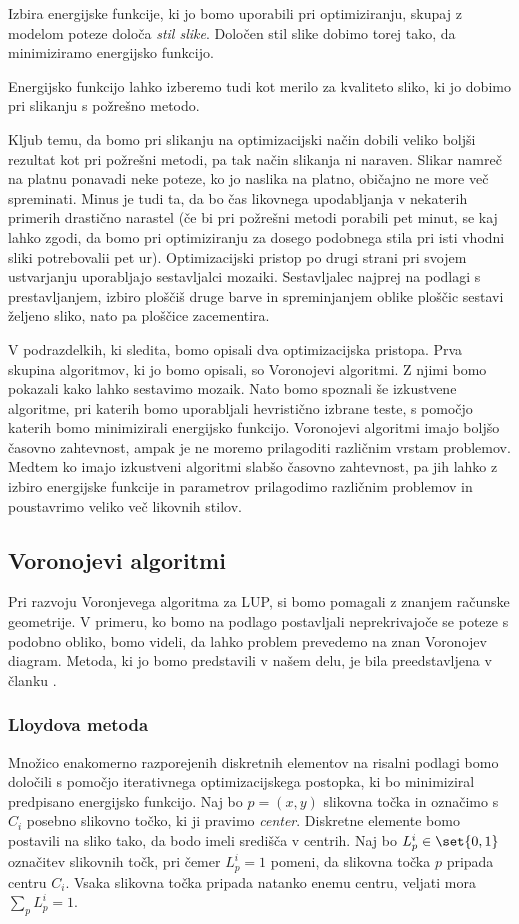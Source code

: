 Izbira energijske funkcije, ki jo bomo uporabili pri optimiziranju, skupaj z modelom poteze določa \emph{stil slike}. Določen stil slike dobimo torej tako, da minimiziramo energijsko funkcijo.
%
\begin{opomba}
Energijsko funkcijo lahko izberemo tudi kot merilo za kvaliteto sliko, ki jo dobimo pri slikanju s požrešno metodo.
\end{opomba}
%
Kljub temu, da bomo pri slikanju na optimizacijski način dobili veliko boljši rezultat kot pri požrešni metodi, pa tak način slikanja ni naraven. Slikar namreč na platnu ponavadi neke poteze, ko jo naslika na platno, običajno ne more več spreminati. Minus je tudi ta, da bo čas likovnega upodabljanja v nekaterih primerih drastično narastel (če bi pri požrešni metodi porabili pet minut, se kaj lahko zgodi, da bomo pri optimiziranju za dosego podobnega stila pri isti vhodni sliki potrebovalii pet ur). Optimizacijski pristop po drugi strani pri svojem ustvarjanju uporabljajo sestavljalci mozaiki. Sestavljalec najprej na podlagi s prestavljanjem, izbiro ploščiš druge barve in spreminjanjem oblike ploščic sestavi željeno sliko, nato pa ploščice zacementira.

V podrazdelkih, ki sledita, bomo opisali dva optimizacijska pristopa. Prva skupina algoritmov, ki jo bomo opisali, so Voronojevi algoritmi. Z njimi bomo pokazali kako lahko sestavimo mozaik. Nato bomo spoznali še izkustvene algoritme, pri katerih bomo uporabljali hevristično izbrane teste, s pomočjo katerih bomo minimizirali energijsko funkcijo. Voronojevi algoritmi imajo boljšo časovno zahtevnost, ampak je ne moremo prilagoditi različnim vrstam problemov. Medtem ko imajo izkustveni algoritmi slabšo časovno zahtevnost, pa jih lahko z izbiro energijske funkcije in parametrov prilagodimo različnim problemov in poustavrimo veliko več likovnih stilov.
%
\subsection{Voronojevi algoritmi}
%
Pri razvoju Voronjevega algoritma za LUP, si bomo pomagali z znanjem računske geometrije. V primeru, ko bomo na podlago postavljali neprekrivajoče se poteze s podobno obliko, bomo videli, da lahko problem prevedemo na znan Voronojev diagram. Metoda, ki jo bomo predstavili v našem delu, je bila preedstavljena v članku \cite{Hausner}.
%
\subsubsection{Lloydova metoda}
Množico enakomerno razporejenih diskretnih elementov na risalni podlagi bomo določili s pomočjo iterativnega optimizacijskega postopka, ki bo minimiziral predpisano energijsko funkcijo. Naj bo $p = (x, y)$ slikovna točka in označimo s $C_i$ posebno slikovno točko, ki ji pravimo \emph{center}. Diskretne elemente bomo postavili na sliko tako, da bodo imeli središča v centrih. Naj bo $L_p^i \in \set{0, 1}$ označitev slikovnih točk, pri čemer $L_p^i = 1$ pomeni, da slikovna točka $p$ pripada centru $C_i$. Vsaka slikovna točka pripada natanko enemu centru, veljati mora $\sum_p L_p^i = 1$.

